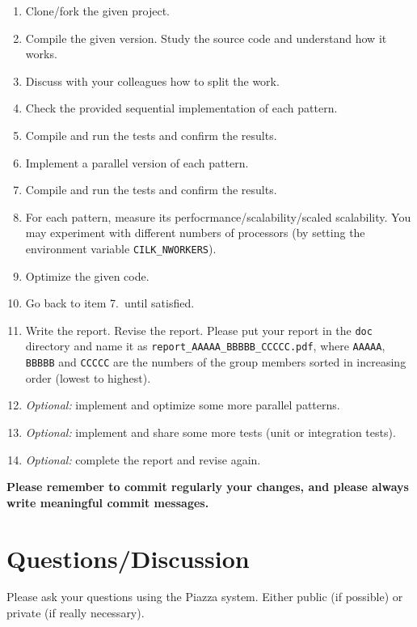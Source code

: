 \documentclass[11pt]{article}
\begin{document}
\begin{enumerate}
  \item Clone/fork the given project.
  \item Compile the given version.  Study the source code and understand how it works.
  \item Discuss with your colleagues how to split the work.
  \item Check the provided sequential implementation of each pattern.
  \item Compile and run the tests and confirm the results.
  \item Implement a parallel version of each pattern.
  \item Compile and run the tests and confirm the results.
  \item For each pattern, measure its perfocrmance/scalability/scaled scalability. You may experiment with different numbers of processors (by setting the environment variable \verb!CILK_NWORKERS!). 
  \item Optimize the given code.
  \item Go back to item 7.\ until satisfied.
  \item Write the report.  Revise the report.  Please put your report in the \verb!doc! directory and name it as \verb!report_AAAAA_BBBBB_CCCCC.pdf!, where \verb!AAAAA!,  \verb!BBBBB! and  \verb!CCCCC! are the numbers of the group members sorted in increasing order (lowest to highest).
  \item \emph{Optional:} implement and optimize some more parallel patterns.
  \item \emph{Optional:} implement and share some more tests (unit or integration tests).
  \item \emph{Optional:} complete the report and revise again.
\end{enumerate}

\textbf{Please remember to commit regularly your changes, and please always write meaningful commit messages.}



\section{Questions/Discussion}

Please ask your questions using the Piazza system.  Either public (if possible) or private (if really necessary).
\end{document}
